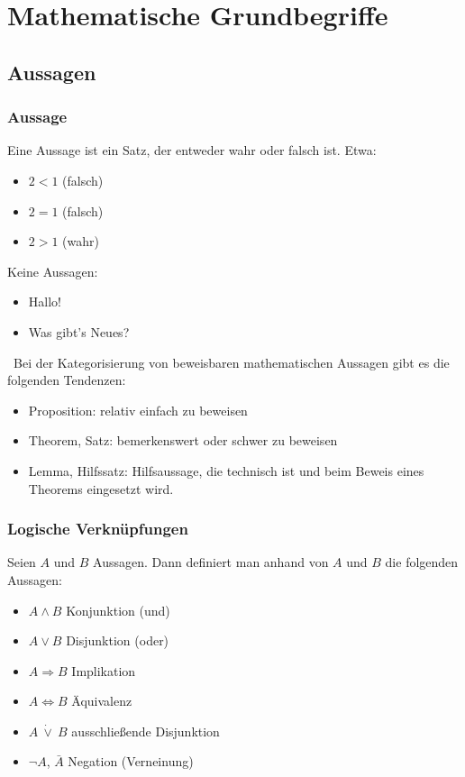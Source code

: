 \section{Mathematische Grundbegriffe}

\subsection{Aussagen}

\subsubsection{Aussage}

Eine Aussage ist ein Satz, der entweder wahr oder falsch ist. Etwa:
\begin{itemize}
	\item $ 2 < 1 $ (falsch)
	\item $ 2 = 1 $ (falsch)
	\item $ 2 > 1 $ (wahr)
\end{itemize}
\noindent Keine Aussagen:
\begin{itemize}
	\item Hallo!
	\item Was gibt's Neues?
\end{itemize}


\begin{bem}\ Bei der Kategorisierung von beweisbaren mathematischen Aussagen gibt es die folgenden Tendenzen: 
	\begin{itemize}
		\item Proposition: relativ einfach zu beweisen
		\item Theorem, Satz: bemerkenswert oder schwer zu beweisen
		\item Lemma, Hilfssatz:  Hilfsaussage, die  technisch  ist und beim Beweis eines Theorems eingesetzt wird. 
	\end{itemize}
\end{bem}


\subsubsection{Logische Verknüpfungen}

Seien $ A $ und $ B $ Aussagen. Dann definiert man anhand von $ A $ und $ B $ die folgenden Aussagen:
\begin{itemize}
	\item $ A \wedge B $ Konjunktion (\glqq und\grqq)
	\item $ A \vee B $ Disjunktion (\glqq oder\grqq)
	\item $ A \Rightarrow B $ Implikation
	\item $ A \Leftrightarrow B $ Äquivalenz
	\item $ A \:\dot{\vee}\: B $ ausschließende Disjunktion
	\item $ \neg A $, $ \bar{A} $ Negation (Verneinung)
\end{itemize}

